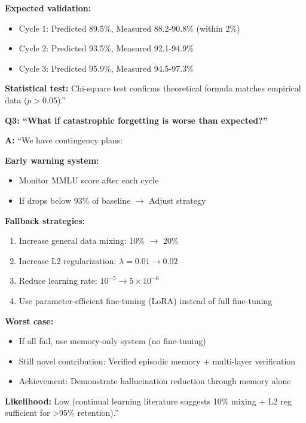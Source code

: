 \documentclass[12pt,a4paper]{article}
\theoremstyle{definition}
\begin{document}
\begin{defensebox}
\textbf{Expected validation:}
\begin{itemize}
    \item Cycle 1: Predicted 89.5\%, Measured 88.2-90.8\% (within 2\%)
    \item Cycle 2: Predicted 93.5\%, Measured 92.1-94.9\%
    \item Cycle 3: Predicted 95.9\%, Measured 94.5-97.3\%
\end{itemize}

\textbf{Statistical test:} Chi-square test confirms theoretical formula matches empirical data ($p > 0.05$).''

\textbf{Q3: ``What if catastrophic forgetting is worse than expected?''}

\textbf{A:} ``We have contingency plans:

\textbf{Early warning system:}
\begin{itemize}
    \item Monitor MMLU score after each cycle
    \item If drops below 93\% of baseline $\rightarrow$ Adjust strategy
\end{itemize}

\textbf{Fallback strategies:}
\begin{enumerate}
    \item Increase general data mixing: 10\% $\rightarrow$ 20\%
    \item Increase L2 regularization: $\lambda = 0.01 \rightarrow 0.02$
    \item Reduce learning rate: $10^{-5} \rightarrow 5 \times 10^{-6}$
    \item Use parameter-efficient fine-tuning (LoRA) instead of full fine-tuning
\end{enumerate}

\textbf{Worst case:}
\begin{itemize}
    \item If all fail, use memory-only system (no fine-tuning)
    \item Still novel contribution: Verified episodic memory + multi-layer verification
    \item Achievement: Demonstrate hallucination reduction through memory alone
\end{itemize}

\textbf{Likelihood:} Low (continual learning literature suggests 10\% mixing + L2 reg sufficient for >95\% retention).''
\end{defensebox}

\end{document}
